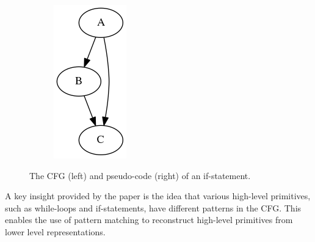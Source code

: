 \documentclass[12pt, a4paper]{article}
\begin{document}
\begin{figure}[H]
   \centering
   \begin{subfigure}[b]{0.15\textwidth}
      \includegraphics[width=\textwidth]{inc/if.png}
   \end{subfigure}
   \qquad
   \begin{subfigure}[b]{0.2\textwidth}
      
   \end{subfigure}
   \caption{The CFG (left) and pseudo-code (right) of an if-statement.}
\end{figure}

A key insight provided by the paper is the idea that various high-level primitives, such as while-loops and if-statements, have different patterns in the CFG. This enables the use of pattern matching to reconstruct high-level primitives from lower level representations.


\end{document}
